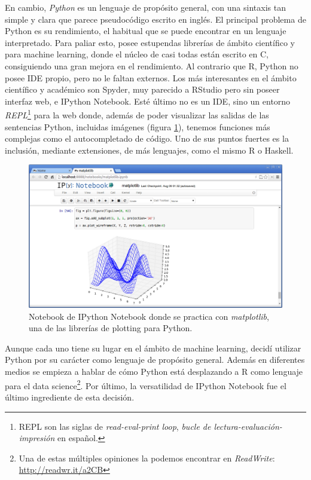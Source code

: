 En cambio, \emph{Python} es un lenguaje de propósito general, con una sintaxis tan simple y clara que parece pseudocódigo escrito en inglés. El principal problema de Python es su rendimiento, el habitual que se puede encontrar en un lenguaje interpretado. Para paliar esto, posee estupendas librerías de ámbito científico y para machine learning, donde el núcleo de casi todas están escrito en C, consiguiendo una gran mejora en el rendimiento. Al contrario que R, Python no posee IDE propio, pero no le faltan externos. Los más interesantes en el ámbito científico y académico son Spyder, muy parecido a RStudio pero sin poseer interfaz web, e IPython Notebook. Esté último no es un IDE, sino un entorno \emph{REPL}\footnote{REPL son las siglas de \emph{read-eval-print loop}, \emph{bucle de lectura-evaluación-impresión} en español.} para la web donde, además de poder visualizar las salidas de las sentencias Python, incluidas imágenes (figura \ref{fig:4.2}), tenemos funciones más complejas como el autocompletado de código. Uno de sus puntos fuertes es la inclusión, mediante extensiones, de más lenguajes, como el mismo R o Haskell.

\begin{figure}[H]
  \centering
  \includegraphics[width=130mm]{figures/ch_04/ipython_notebook.png}
  \caption{Notebook de IPython Notebook donde se practica con \emph{matplotlib}, una de las librerías de plotting para Python.}
  \label{fig:4.2}
\end{figure}

Aunque cada uno tiene su lugar en el ámbito de machine learning, decidí utilizar Python por su carácter como lenguaje de propósito general. Además en diferentes medios se empieza a hablar de cómo Python está desplazando a R como lenguaje para el data science\footnote{Una de estas múltiples opiniones la podemos encontrar en \emph{ReadWrite}: \url{http://readwr.it/a2CB}}. Por último, la versatilidad de IPython Notebook fue el último ingrediente de esta decisión.

